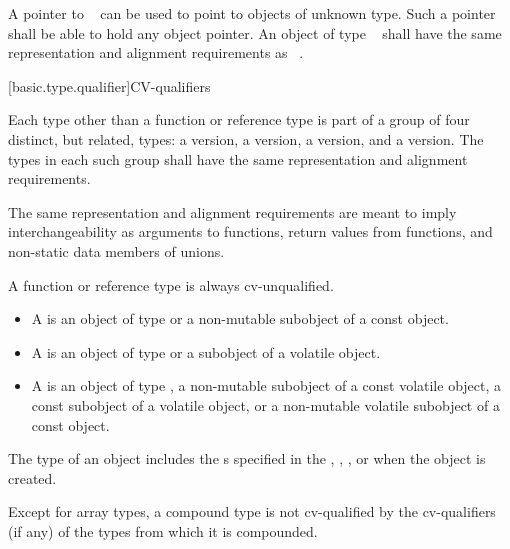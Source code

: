 \pnum
{}%
%
A pointer to \cv{}~
can be used to point to objects of
unknown type. Such a pointer shall be able to hold any object pointer.
An object of type \cv{}~
shall have the same representation and alignment
requirements as \cv{}~.

[basic.type.qualifier]{CV-qualifiers}

\pnum
{}%
%
%
Each type other than a function or reference type
is part of a group of four distinct, but related, types:
a  version,
a  version,
a  version, and
a  version.
The types in each such group shall have
the same representation and alignment requirements.
\begin{footnote}
The same representation and alignment requirements
are meant to imply interchangeability as
arguments to functions,
return values from functions, and
non-static data members of unions.
\end{footnote}
A function or reference type is always cv-unqualified.
\begin{itemize}
\item A  is an object of type  or a
  non-mutable subobject of a const object.

\item A  is an object of type
   or a subobject of a volatile object.

\item A  is an object of type
  , a non-mutable subobject of a const volatile object,
  a const subobject of a volatile object, or a non-mutable volatile
  subobject of a const object.
\end{itemize}
\begin{note}
The type of an object includes
the s specified in the
,
,
, or
when the object is created.
\end{note}

\pnum
Except for array types, a compound type is not cv-qualified by the
cv-qualifiers (if any) of the types from which it is compounded.

